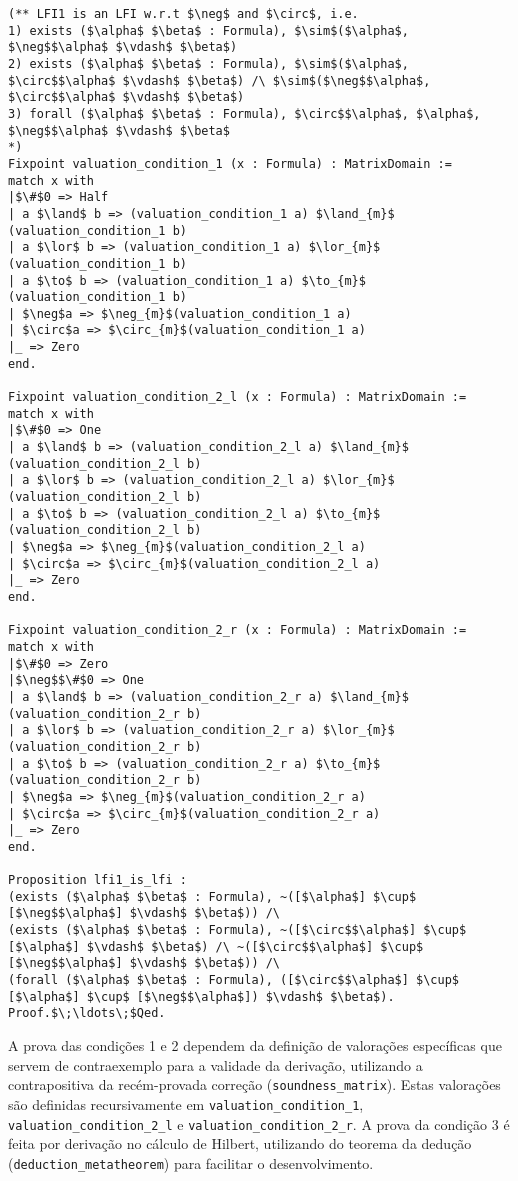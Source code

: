         \begin{lstlisting}[name=LFI, frame=single, language=coq]
(** LFI1 is an LFI w.r.t $\neg$ and $\circ$, i.e. 
1) exists ($\alpha$ $\beta$ : Formula), $\sim$($\alpha$, $\neg$$\alpha$ $\vdash$ $\beta$)
2) exists ($\alpha$ $\beta$ : Formula), $\sim$($\alpha$, $\circ$$\alpha$ $\vdash$ $\beta$) /\ $\sim$($\neg$$\alpha$, $\circ$$\alpha$ $\vdash$ $\beta$)
3) forall ($\alpha$ $\beta$ : Formula), $\circ$$\alpha$, $\alpha$, $\neg$$\alpha$ $\vdash$ $\beta$
*)
Fixpoint valuation_condition_1 (x : Formula) : MatrixDomain :=
match x with 
|$\#$0 => Half
| a $\land$ b => (valuation_condition_1 a) $\land_{m}$ (valuation_condition_1 b)
| a $\lor$ b => (valuation_condition_1 a) $\lor_{m}$ (valuation_condition_1 b)
| a $\to$ b => (valuation_condition_1 a) $\to_{m}$ (valuation_condition_1 b)
| $\neg$a => $\neg_{m}$(valuation_condition_1 a)
| $\circ$a => $\circ_{m}$(valuation_condition_1 a)
|_ => Zero 
end.

Fixpoint valuation_condition_2_l (x : Formula) : MatrixDomain :=
match x with 
|$\#$0 => One
| a $\land$ b => (valuation_condition_2_l a) $\land_{m}$ (valuation_condition_2_l b)
| a $\lor$ b => (valuation_condition_2_l a) $\lor_{m}$ (valuation_condition_2_l b)
| a $\to$ b => (valuation_condition_2_l a) $\to_{m}$ (valuation_condition_2_l b)
| $\neg$a => $\neg_{m}$(valuation_condition_2_l a)
| $\circ$a => $\circ_{m}$(valuation_condition_2_l a)
|_ => Zero 
end.

Fixpoint valuation_condition_2_r (x : Formula) : MatrixDomain :=
match x with 
|$\#$0 => Zero
|$\neg$$\#$0 => One
| a $\land$ b => (valuation_condition_2_r a) $\land_{m}$ (valuation_condition_2_r b)
| a $\lor$ b => (valuation_condition_2_r a) $\lor_{m}$ (valuation_condition_2_r b)
| a $\to$ b => (valuation_condition_2_r a) $\to_{m}$ (valuation_condition_2_r b)
| $\neg$a => $\neg_{m}$(valuation_condition_2_r a)
| $\circ$a => $\circ_{m}$(valuation_condition_2_r a)
|_ => Zero 
end.

Proposition lfi1_is_lfi :
(exists ($\alpha$ $\beta$ : Formula), ~([$\alpha$] $\cup$ [$\neg$$\alpha$] $\vdash$ $\beta$)) /\
(exists ($\alpha$ $\beta$ : Formula), ~([$\circ$$\alpha$] $\cup$ [$\alpha$] $\vdash$ $\beta$) /\ ~([$\circ$$\alpha$] $\cup$ [$\neg$$\alpha$] $\vdash$ $\beta$)) /\
(forall ($\alpha$ $\beta$ : Formula), ([$\circ$$\alpha$] $\cup$ [$\alpha$] $\cup$ [$\neg$$\alpha$]) $\vdash$ $\beta$).
Proof.$\;\ldots\;$Qed.
        \end{lstlisting}

        A prova das condições 1 e 2 dependem da definição de valorações específicas que servem de contraexemplo para a validade da derivação, utilizando a contrapositiva da recém-provada correção (\texttt{soundness\_matrix}). Estas valorações são definidas recursivamente em \texttt{valuation\_condition\_1}, \texttt{valuation\_condition\_2\_l} e \texttt{valuation\_condition\_2\_r}. A prova da condição 3 é feita por derivação no cálculo de Hilbert, utilizando do teorema da dedução (\texttt{deduction\_metatheorem}) para facilitar o desenvolvimento.
    
